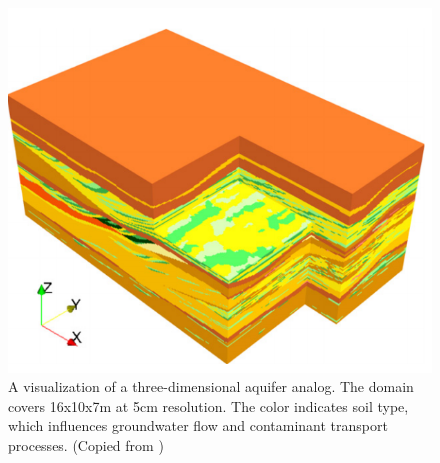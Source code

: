 \begin{figure}[!htbp]
   \centering
   \includegraphics{./fig/herten.png} %
   \caption{A visualization of a three-dimensional aquifer analog. The domain covers 16x10x7m at 5cm resolution. The color indicates soil type, which influences groundwater flow and contaminant transport processes. (Copied from \cite{Comunian2011a})}
   \label{fig:herten}
\end{figure}


